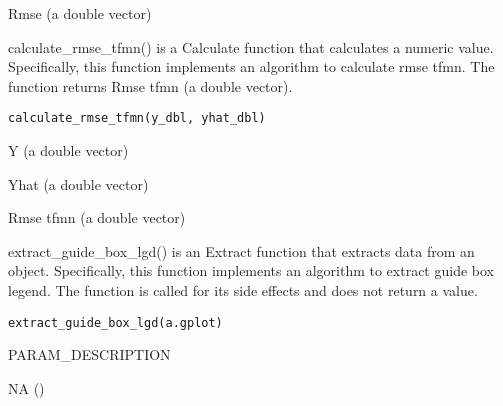 \documentclass[a4paper]{book}
\begin{document}
%
\begin{Value}
Rmse (a double vector)
\end{Value}
%
\begin{Description}\relax
calculate\_rmse\_tfmn() is a Calculate function that calculates a numeric value. Specifically, this function implements an algorithm to calculate rmse tfmn. The function returns Rmse tfmn (a double vector).
\end{Description}
%
\begin{Usage}
\begin{verbatim}
calculate_rmse_tfmn(y_dbl, yhat_dbl)
\end{verbatim}
\end{Usage}
%
\begin{Arguments}
\begin{ldescription}
\item[\code{y\_dbl}] Y (a double vector)

\item[\code{yhat\_dbl}] Yhat (a double vector)
\end{ldescription}
\end{Arguments}
%
\begin{Value}
Rmse tfmn (a double vector)
\end{Value}
%
\begin{Description}\relax
extract\_guide\_box\_lgd() is an Extract function that extracts data from an object. Specifically, this function implements an algorithm to extract guide box legend. The function is called for its side effects and does not return a value.
\end{Description}
%
\begin{Usage}
\begin{verbatim}
extract_guide_box_lgd(a.gplot)
\end{verbatim}
\end{Usage}
%
\begin{Arguments}
\begin{ldescription}
\item[\code{a.gplot}] PARAM\_DESCRIPTION
\end{ldescription}
\end{Arguments}
%
\begin{Value}
NA ()
\end{Value}
\end{document}
